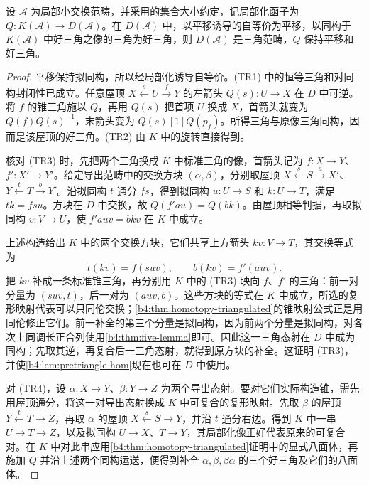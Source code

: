 \begin{theorem}\label{b4:thm:derived-triangulated}
	设 \(\mathcal A\) 为局部小交换范畴，并采用的集合大小约定，记局部化函子为 \(Q:K(\mathcal A)\to D(\mathcal A)\)。在 \(D(\mathcal A)\) 中，以平移诱导的自等价为平移，以同构于 \(K(\mathcal A)\) 中好三角之像的三角为好三角，则 \(D(\mathcal A)\) 是三角范畴，\(Q\) 保持平移和好三角。
\end{theorem}
\begin{proof}
	平移保持拟同构，所以经局部化诱导自等价。(TR1) 中的恒等三角和对同构封闭性已成立。任意屋顶 \(X\xleftarrow{s}U\xrightarrow{f}Y\) 的左箭头 \(Q(s):U\to X\) 在 \(D\) 中可逆。将 \(f\) 的锥三角施以 \(Q\)，再用 \(Q(s)\) 把首项 \(U\) 换成 \(X\)，首箭头就变为 \(Q(f)Q(s)^{-1}\)，末箭头变为 \(Q(s)[1]Q(p_f)\)。所得三角与原像三角同构，因而是该屋顶的好三角。(TR2) 由 \(K\) 中的旋转直接得到。

	核对 (TR3) 时，先把两个三角换成 \(K\) 中标准三角的像，首箭头记为 \(f:X\to Y\)、\(f':X'\to Y'\)。给定导出范畴中的交换方块 \((\alpha,\beta)\)，分别取屋顶 \(X\xleftarrow{s}S\xrightarrow{a}X'\)、\(Y\xleftarrow{t}T\xrightarrow{b}Y'\)。沿拟同构 \(t\) 通分 \(fs\)，得到拟同构 \(u:U\to S\) 和 \(k:U\to T\)，满足 \(t k=fsu\)。方块在 \(D\) 中交换，故 \(Q(f'au)=Q(bk)\)。由屋顶相等判据，再取拟同构 \(v:V\to U\)，使 \(f'auv=bkv\) 在 \(K\) 中成立。

	上述构造给出 \(K\) 中的两个交换方块，它们共享上方箭头 \(kv:V\to T\)，其交换等式为
	\[
		t(kv)=f(suv),\qquad b(kv)=f'(auv).
	\]
	把 \(kv\) 补成一条标准锥三角，再分别用 \(K\) 中的 (TR3) 映向 \(f\)、\(f'\) 的三角：前一对分量为 \((suv,t)\)，后一对为 \((auv,b)\)。这些方块的等式在 \(K\) 中成立，所选的复形映射代表可以只同伦交换；\cref{b4:thm:homotopy-triangulated}的锥映射公式正是用同伦修正它们。前一补全的第三个分量是拟同构，因为前两个分量是拟同构，对各次上同调长正合列使用\cref{b4:thm:five-lemma}即可。因此这一三角态射在 \(D\) 中成为同构；先取其逆，再复合后一三角态射，就得到原方块的补全。这证明 (TR3)，并使\cref{b4:lem:pretriangle-hom}现在也可在 \(D\) 中使用。

	对 (TR4)，设 \(\alpha:X\to Y\)、\(\beta:Y\to Z\) 为两个导出态射。要对它们实际构造锥，需先用屋顶通分，将这一对导出态射换成 \(K\) 中可复合的复形映射。先取 \(\beta\) 的屋顶 \(Y\xleftarrow{t}T\to Z\)，再取 \(\alpha\) 的屋顶 \(X\xleftarrow{s}S\to Y\)，并沿 \(t\) 通分右边。得到 \(K\) 中一串 \(U\to T\to Z\)，以及拟同构 \(U\to X\)、\(T\to Y\)，其局部化像正好代表原来的可复合对。在 \(K\) 中对此串应用\cref{b4:thm:homotopy-triangulated}证明中的显式八面体，再施加 \(Q\) 并沿上述两个同构运送，便得到补全 \(\alpha,\beta,\beta\alpha\) 的三个好三角及它们的八面体。


\end{proof}
